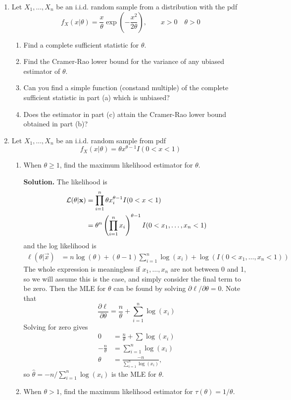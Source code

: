 \documentclass[titlepage]{article}
\begin{document}
\begin{enumerate}
\item Let $X_1, \ldots, X_n$ be an i.i.d. random sample from a distribution with the pdf
  \[f_X(x|\theta) = \frac{x}{\theta}\exp\left(-\frac{x^2}{2\theta}\right),\qquad x > 0 \quad \theta > 0\]

  \begin{enumerate}
  \item Find a complete sufficient statistic for $\theta$.

  \item Find the Cramer-Rao lower bound for the variance of any ubiased estimator of $\theta$.

  \item Can you find a simple function (constand multiple) of the complete sufficient statistic in part (a) which is unbiased?

  \item Does the estimator in part (c) attain the Cramer-Rao lower bound obtained in part (b)?
  \end{enumerate}

\item Let $X_1, \ldots, X_n$ be an i.i.d. random sample from pdf
  \[f_X(x | \theta) = \theta x^{\theta - 1} I(0 < x < 1)\]
  \begin{enumerate}
  \item When $\theta \geq 1$, find the maximum likelihood estimator for $\theta$.

  \textbf{Solution.} The likelihood is
    \[\begin{aligned}
    \mathcal{L}(\theta | \mathbf{x}) &= \prod_{i=1}^n \theta x_i^{\theta - 1} I(0<x<1) \\
    &= \theta^n \left( \prod_{i=1}^n x_i \right)^{\theta - 1} I(0 < x_1, \ldots, x_n < 1)
    \end{aligned}\]
  and the log likelihood is
    \[\begin{aligned}
    \ell(\theta | \vec{x}) &= n\log(\theta) + (\theta - 1) \sum_{i=1}^n \log(x_i) + \log(I(0<x_1, \ldots, x_n < 1))
    \end{aligned}\]
  The whole expression is meaningless if $x_1, \ldots, x_n$ are not between 0 and 1, so we will assume this is the case, and simply consider the final term to be zero. Then the MLE for $\theta$ can be found by solving $\partial \ell/\partial \theta = 0$. Note that
  \[\frac{\partial \ell}{\partial \theta} = \frac{n}{\theta} + \sum_{i=1}^n \log(x_i)\]
  Solving for zero gives
  \[\begin{aligned}
  0 &= \frac{n}{\theta} + \sum\log(x_i) \\
  -\frac{n}{\theta} &= \sum_{i=1}^n \log(x_i) \\
  \theta &= \frac{-n}{\sum_{i=1}^n \log(x_i)},
  \end{aligned}\]
  so $\hat{\theta} = -n/\sum_{i=1}^n \log(x_i)$ is the MLE for $\theta$.
  \item When $\theta > 1$, find the maximum likelihood estimator for $\tau(\theta) = 1/\theta$.


\end{enumerate}
\end{enumerate}
\end{document}
